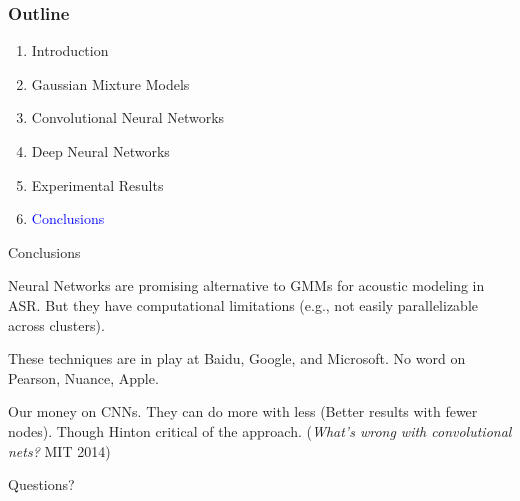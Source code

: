 \documentclass[notes]{beamer}
\begin{document}
\begin{frame}
	\frametitle{Outline}
	
	\begin{enumerate}
		\item Introduction
		\item Gaussian Mixture Models
		\item Convolutional Neural Networks
		\item Deep Neural Networks
		\item Experimental Results
		\item \textcolor{blue}{Conclusions}
	\end{enumerate}
\end{frame}

\begin{frame}{Conclusions}
	\vfill

	\begin{center}
		Neural Networks are promising alternative to GMMs for acoustic modeling in ASR. But they have computational limitations \newline (e.g., not easily parallelizable across clusters).
	\end{center}
	
	\vfill
	
	\begin{center}
		These techniques are in play at Baidu, Google, and Microsoft. No word on Pearson, Nuance, Apple.
	\end{center}

	\vfill

	\begin{center}
		Our money on CNNs. They can do more with less (Better results with fewer nodes). Though Hinton critical of the approach.\newline
		(\textit{What's wrong with convolutional nets?} MIT 2014)
	\end{center}
	
	\vfill
\end{frame}

\begin{frame}
	\begin{center}
		Questions?
	\end{center}
\end{frame}
\end{document}
